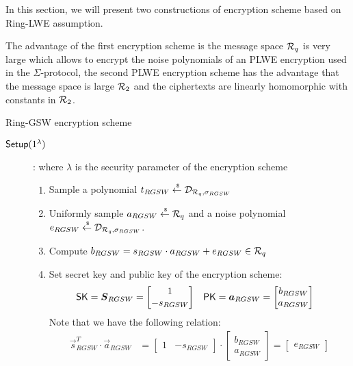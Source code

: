 In this section, we will present two constructions of encryption scheme based on Ring-LWE assumption.

The advantage of the first encryption scheme is the message space ${\mathcal{R}}_q$ is very large which allows to encrypt the noise polynomials of an PLWE encryption used in the $\Sigma$-protocol,
the second PLWE encryption scheme has the advantage that the message space is large ${\mathcal{R}}_2$ and the ciphertexts are linearly homomorphic with constants in ${\mathcal{R}}_2$.


\begin{subsection}{Ring-GSW encryption scheme~\cite{DBLP:journals/tc/KhedrGV16}}
  \begin{description}
  \item[${\mathsf{Setup}}(1^\lambda)$]: where $\lambda$ is the security parameter of the encryption scheme
    \begin{enumerate}
    \item Sample a polynomial $t_{RGSW} \stackrel{{\scriptscriptstyle \mkern4mu \$}}{\gets} \mathcal{D}_{{\mathcal{R}}_q, \sigma_{RGSW}}$
    \item Uniformly sample $a_{RGSW} \stackrel{{\scriptscriptstyle \mkern4mu \$}}{\gets} {\mathcal{R}}_q$ and a noise polynomial $e_{RGSW} \stackrel{{\scriptscriptstyle \mkern4mu \$}}{\gets} \mathcal{D}_{{\mathcal{R}}_q, \sigma_{RGSW}}$.
    \item Compute $b_{RGSW} = s_{RGSW} \cdot a_{RGSW} + e_{RGSW} \in {\mathcal{R}}_q$
    \item Set secret key and public key of the encryption scheme:
      \begin{align*}
        \SK &= \vec{S}_{RGSW} =\begin{bmatrix} 1 \\ -s_{RGSW} \end{bmatrix}  & \PK &= \vec{a}_{RGSW} =  \begin{bmatrix} b_{RGSW} \\ a_{RGSW}\end{bmatrix}
      \end{align*}
      Note that we have the following relation:
      \begin{align*}
        \vec{s}_{RGSW}^T \cdot \vec{a}_{RGSW} &= \begin{bmatrix} 1 & -s_{RGSW} \end{bmatrix} \cdot \begin{bmatrix} b_{RGSW} \\ a_{RGSW}\end{bmatrix} = \begin{bmatrix} e_{RGSW} \end{bmatrix}

\end{align*}
\end{enumerate}
\end{description}
\end{subsection}
